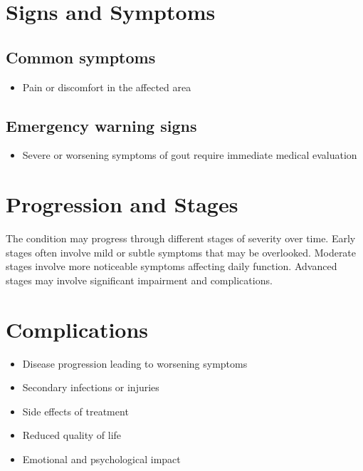 \section{Signs and Symptoms}

\subsection{Common symptoms}
\begin{itemize}[noitemsep]
  \item Pain or discomfort in the affected area
  \end{itemize}

\subsection{Emergency warning signs}
\begin{itemize}[noitemsep]
  \item Severe or worsening symptoms of gout require immediate medical evaluation
\end{itemize}
\section{Progression and Stages}
The condition may progress through different stages of severity over time. Early stages often involve mild or subtle symptoms that may be overlooked. Moderate stages involve more noticeable symptoms affecting daily function. Advanced stages may involve significant impairment and complications.
\section{Complications}
\begin{itemize}[noitemsep]
  \item Disease progression leading to worsening symptoms
  \item Secondary infections or injuries
  \item Side effects of treatment
  \item Reduced quality of life
  \item Emotional and psychological impact
\end{itemize}
